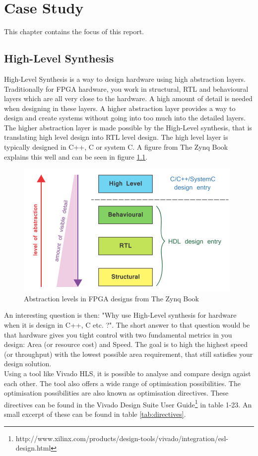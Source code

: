 \chapter{Case Study}
This chapter contains the focus of this report.

\section{High-Level Synthesis}
High-Level Synthesis is a way to design hardware using high abstraction layers. Traditionally for FPGA hardware, you work in structural, RTL and behavioural layers which are all very close to the hardware. A high amount of detail is needed when designing in these layers. A higher abstraction layer provides a way to design and create systems without going into too much  into the detailed layers. The higher abstraction layer is made possible by the High-Level synthesis, that is translating high level design into RTL level design. The high level layer is typically designed in C++, C or system C. A figure from The Zynq Book\cite{crockett2014the} explains this well and can be seen in figure \ref{fig:abslevels}.
\begin{figure}[H]
\centering
\includegraphics[scale=1]{billeder/abslevels}
\caption{Abstraction levels in FPGA designs from The Zynq Book}
\label{fig:abslevels}
\end{figure}
An interesting question is then: "Why use High-Level synthesis for hardware when it is design in C++, C etc. ?". The short answer to that question would be that hardware gives you tight control with two fundamental metrics in you  design: Area (or resource cost) and Speed. The goal is to high the highest speed (or throughput) with the lowest possible area requirement, that still satisfies your design solution.\\
Using a tool like Vivado HLS, it is possible to analyse and compare design agaist each other. The tool also offers a wide range of optimisation possibilities. The  optimisation possibilities are also known as optimisation directives. These directives can be found in the Vivado Design Suite User Guide\footnote{http://www.xilinx.com/products/design-tools/vivado/integration/esl-design.html} in table 1-23. An small excerpt of these can be found in table \ref{tab:directives}.
